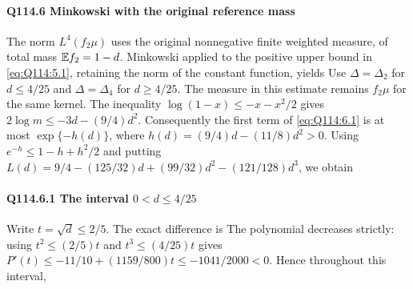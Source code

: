 \paragraph{Q114.6 Minkowski with the original reference mass}\label{part:Q114.6}
The norm $L^4(f_2\mu)$ uses the original nonnegative finite weighted
measure, of total mass $\mathbb E f_2=\allowbreak 1-d$.
Minkowski applied to the positive upper bound in
\eqref{eq:Q114:5.1}, retaining the norm of the constant function, yields
Use $\Delta=\allowbreak \Delta_2$ for $d\le\allowbreak 4/25$ and $\Delta=\allowbreak \Delta_4$ for
$d\ge\allowbreak 4/25$. The measure in this estimate remains $f_2\mu$ for the
same kernel. The inequality $\log(1-x)\le\allowbreak -x-x^2/2$ gives
$2\log m\le\allowbreak -3d-(9/4)d^2$.
Consequently the first term of \eqref{eq:Q114:6.1} is at most
$\exp\{-h(d)\}$, where $h(d)=\allowbreak (9/4)d-(11/8)d^2>\allowbreak 0$.
Using $e^{-h}\le\allowbreak 1-h+h^2/2$ and putting
$L(d)=\allowbreak 9/4-(125/32)d+(99/32)d^2-(121/128)d^3$, we obtain

\paragraph{Q114.6.1 The interval $0<\allowbreak d\le\allowbreak 4/25$}\label{part:Q114.6.1}
Write $t=\allowbreak \sqrt d\le\allowbreak 2/5$. The exact difference is
The polynomial decreases strictly: using $t^2\le\allowbreak (2/5)t$ and
$t^3\le\allowbreak (4/25)t$ gives
$P'(t)\le\allowbreak -11/10+(1159/800)t\le\allowbreak -1041/2000<\allowbreak 0$.
Hence throughout this interval,

